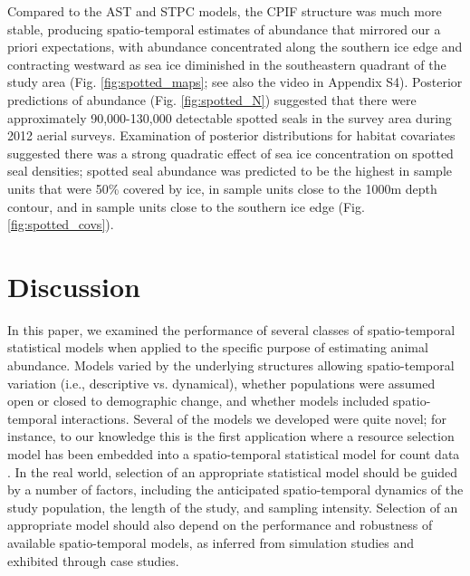 \documentclass[12pt,english]{article}
\begin{document}
\begin{spacing}{1.9}
Compared to the AST and STPC models, the CPIF structure was much more stable, producing spatio-temporal estimates of abundance that mirrored our a priori expectations, with abundance concentrated along the southern ice edge and contracting westward as sea ice diminished in the southeastern quadrant of the study area (Fig. \ref{fig:spotted_maps}; see also the video in Appendix S4).  Posterior predictions of abundance (Fig. \ref{fig:spotted_N}) suggested that there were approximately 90,000-130,000 detectable spotted seals in the survey area during 2012 aerial surveys.  Examination of posterior distributions for habitat covariates suggested there was a strong quadratic effect of sea ice concentration on spotted seal densities; spotted seal abundance was predicted to be the highest in sample units that were 50\% covered by ice, in sample units close to the 1000m depth contour, and in sample units close to the southern ice edge (Fig. \ref{fig:spotted_covs}).

\section{Discussion}

In this paper, we examined the performance of several classes of spatio-temporal statistical models when applied to the specific purpose of estimating animal abundance.  Models varied by the underlying structures allowing spatio-temporal variation (i.e., descriptive vs. dynamical), whether populations were assumed open or closed to demographic change, and whether models included spatio-temporal interactions.  Several of the models we developed were quite novel; for instance, to our knowledge this is the first application where a resource selection model has been embedded into a spatio-temporal statistical model for count data \citep[though see][for an example integrating resource selection into capture-recapture models]{RoyleEtAl2013}.  In the real world, selection of an appropriate statistical model should be guided by a number of factors, including the anticipated spatio-temporal dynamics of the study population, the length of the study, and sampling intensity.  Selection of an appropriate model should also depend on the performance and robustness of available spatio-temporal models, as inferred from simulation studies and exhibited through case studies.


\end{spacing}
\end{document}
